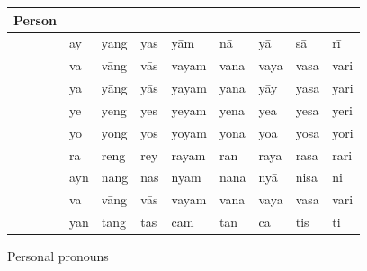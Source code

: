 \begin{figure}[tp]\centering
\caption{Personal pronouns}

\begin{tabu} to \linewidth{S X[c] X[c] X[c] X[c] X[c] X[c] X[c] X[c]}
\tableheaderfont\toprule
Person
	& \Top{}
	& \Aarg{}
	& \Parg{}
	& \Dat{}
	& \Gen{}
	& \Loc{}
	& \Caus{}
	& \Ins{}
	\\
\toprule

\Fsg{}
	& ay	%
	& yang	%
	& yas	%
	& yām	%
	& nā	%
	& yā	%
	& sā	%
	& rī	%
	\\
	
\midrule

\Ssg{}
	& va	%
	& vāng	%
	& vās	%
	& vayam	%
	& vana	%
	& vaya	%
	& vasa	%
	& vari	%
	\\

\midrule

\TsgM{}
	& ya	%
	& yāng	%
	& yās	%
	& yayam	%
	& yana	%
	& yāy	%
	& yasa	%
	& yari	%
	\\

\TsgF{}
	& ye	%
	& yeng	%
	& yes	%
	& yeyam	%
	& yena	%
	& yea	%
	& yesa	%
	& yeri	%
	\\

\TsgN{}
	& yo	%
	& yong	%
	& yos	%
	& yoyam	%
	& yona	%
	& yoa	%
	& yosa	%
	& yori	%
	\\

\TsgI{}
	& ra	%
	& reng	%
	& rey	%
	& rayam	%
	& ran	%
	& raya	%
	& rasa	%
	& rari	%
	\\

\midrule

\Fpl{}
	& ayn	%
	& nang	%
	& nas	%
	& nyam	%
	& nana	%
	& nyā	%
	& nisa	%
	& ni	%
	\\
	
\midrule

\Spl{}
	& va	%
	& vāng	%
	& vās	%
	& vayam	%
	& vana	%
	& vaya	%
	& vasa	%
	& vari	%
	\\

\midrule

\TplM{}
	& yan	%
	& tang	%
	& tas	%
	& cam	%
	& tan	%
	& ca	%
	& tis	%
	& ti	%
	\\


\end{tabu}
\end{figure}

